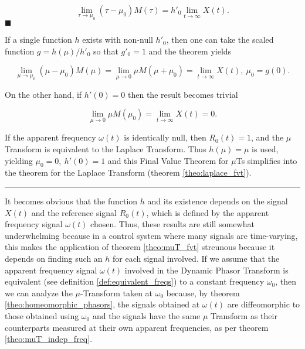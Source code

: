 \begin{equation} \lim\limits_{\tau\to \mu_0} \left(\tau - \mu_0\right) M\left(\tau\right) = h'_0\lim\limits_{t\to\infty} X(t). \label{eq:fvt_uT_3}\end{equation}
\hfill$\blacksquare$
\begin{remark} If a single function $h$ exists with non-null $h'_0$, then one can take the scaled function $g = h(\mu)/h'_0$ so that $g'_0 = 1$ and the theorem yields

\begin{equation} \lim\limits_{\mu\to \mu_0} \left(\mu - \mu_0\right)M\left(\mu\right) = \lim\limits_{\mu \to 0} \mu M\left(\mu + \mu_0\right) = \lim\limits_{t\to\infty} X(t),\ \mu_0 = g(0).\end{equation}

	On the other hand, if $h'(0) = 0$ then the result becomes trivial

\begin{equation} \lim\limits_{\mu \to 0} \mu M\left(\mu_0\right) = \lim\limits_{t\to\infty} X(t) = 0.\end{equation}
\end{remark}
\begin{remark}\label{remark:theo_muT_fvt_null_freq} If the apparent frequency $\omega(t)$ is identically null, then $R_0(t) = 1$, and the $\mu$ Transform is equivalent to the Laplace Transform. Thus $h(\mu) = \mu$ is used, yielding $\mu_0 = 0,\ h'(0) = 1$ and this Final Value Theorem for $\mu$Ts simplifies into the theorem for the Laplace Transform (theorem \ref{theo:laplace_fvt}).
\end{remark}
\hrule
\vspace{3mm} %

	It becomes obvious that the function $h$ and its existence depends on the signal $X(t)$ and the reference signal $R_0(t)$, which is defined by the apparent frequency signal $\omega(t)$ chosen. Thus, these results are still somewhat underwhelming because in a control system where many signals are time-varying, this makes the application of theorem \ref{theo:muT_fvt} streunous because it depends on finding such an $h$ for each signal involved. If we assume that the apparent frequency signal $\omega(t)$ involved in the Dynamic Phasor Transform is equivalent (see definition \ref{def:equivalent_freqs}) to a constant frequency $\omega_0$, then we can analyze the $\mu$-Transform taken at $\omega_0$ because, by theorem \ref{theo:homeomorphic_phasors}, the signals obtained at $\omega(t)$ are diffeomorphic to those obtained using $\omega_0$ and the signals have the same $\mu$ Transform as their counterparts measured at their own apparent frequencies, as per theorem \ref{theo:muT_indep_freq}.

